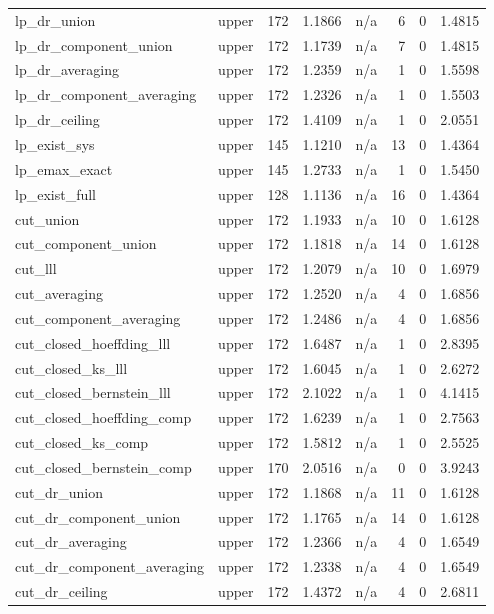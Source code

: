 \begin{table}[htbp]
\begin{tabular}{llrrrrrr}
lp\_dr\_union & upper & 172 & 1.1866 & n/a & 6 & 0 & 1.4815 \\
lp\_dr\_component\_union & upper & 172 & 1.1739 & n/a & 7 & 0 & 1.4815 \\
lp\_dr\_averaging & upper & 172 & 1.2359 & n/a & 1 & 0 & 1.5598 \\
lp\_dr\_component\_averaging & upper & 172 & 1.2326 & n/a & 1 & 0 & 1.5503 \\
lp\_dr\_ceiling & upper & 172 & 1.4109 & n/a & 1 & 0 & 2.0551 \\
lp\_exist\_sys & upper & 145 & 1.1210 & n/a & 13 & 0 & 1.4364 \\
lp\_emax\_exact & upper & 145 & 1.2733 & n/a & 1 & 0 & 1.5450 \\
lp\_exist\_full & upper & 128 & 1.1136 & n/a & 16 & 0 & 1.4364 \\
cut\_union & upper & 172 & 1.1933 & n/a & 10 & 0 & 1.6128 \\
cut\_component\_union & upper & 172 & 1.1818 & n/a & 14 & 0 & 1.6128 \\
cut\_lll & upper & 172 & 1.2079 & n/a & 10 & 0 & 1.6979 \\
cut\_averaging & upper & 172 & 1.2520 & n/a & 4 & 0 & 1.6856 \\
cut\_component\_averaging & upper & 172 & 1.2486 & n/a & 4 & 0 & 1.6856 \\
cut\_closed\_hoeffding\_lll & upper & 172 & 1.6487 & n/a & 1 & 0 & 2.8395 \\
cut\_closed\_ks\_lll & upper & 172 & 1.6045 & n/a & 1 & 0 & 2.6272 \\
cut\_closed\_bernstein\_lll & upper & 172 & 2.1022 & n/a & 1 & 0 & 4.1415 \\
cut\_closed\_hoeffding\_comp & upper & 172 & 1.6239 & n/a & 1 & 0 & 2.7563 \\
cut\_closed\_ks\_comp & upper & 172 & 1.5812 & n/a & 1 & 0 & 2.5525 \\
cut\_closed\_bernstein\_comp & upper & 170 & 2.0516 & n/a & 0 & 0 & 3.9243 \\
cut\_dr\_union & upper & 172 & 1.1868 & n/a & 11 & 0 & 1.6128 \\
cut\_dr\_component\_union & upper & 172 & 1.1765 & n/a & 14 & 0 & 1.6128 \\
cut\_dr\_averaging & upper & 172 & 1.2366 & n/a & 4 & 0 & 1.6549 \\
cut\_dr\_component\_averaging & upper & 172 & 1.2338 & n/a & 4 & 0 & 1.6549 \\
cut\_dr\_ceiling & upper & 172 & 1.4372 & n/a & 4 & 0 & 2.6811 \\

\end{tabular}
\end{table}
